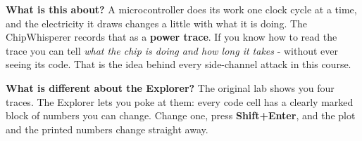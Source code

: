 \documentclass[11pt,letterpaper]{article}
\begin{document}
\vspace{4pt}


\guidelegend

\vspace{4pt}


\clearpage

\tableofcontents

\clearpage


\textbf{What is this about?} A microcontroller does its work one clock cycle at a time, and the electricity it draws
changes a little with what it is doing. The ChipWhisperer records that as a \textbf{power trace}. If you know how to
read the trace you can tell \emph{what the chip is doing and how long it takes} - without ever seeing its code. That
is the idea behind every side-channel attack in this course.

\textbf{What is different about the Explorer?} The original lab shows you four traces. The Explorer lets you poke at
them: every code cell has a clearly marked block of numbers you can change. Change one, press \textbf{Shift+Enter},
and the plot and the printed numbers change straight away.

\end{document}
